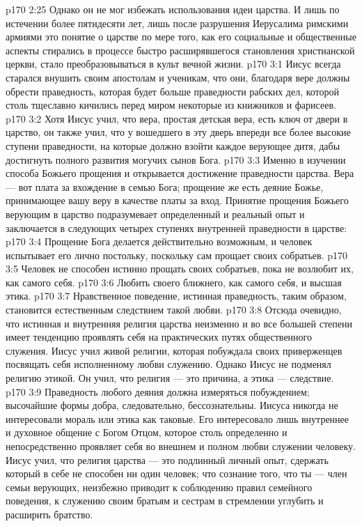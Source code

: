 \vs p170 2:25 Однако он не мог избежать использования идеи царства. И лишь по истечении более пятидесяти лет, лишь после разрушения Иерусалима римскими армиями это понятие о царстве по мере того, как его социальные и общественные аспекты стирались в процессе быстро расширявшегося становления христианской церкви, стало преобразовываться в культ вечной жизни.
\vs p170 3:1 Иисус всегда старался внушить своим апостолам и ученикам, что они, благодаря вере должны обрести праведность, которая будет больше праведности рабских дел, которой столь тщеславно кичились перед миром некоторые из книжников и фарисеев.
\vs p170 3:2 Хотя Иисус учил, что вера, простая детская вера, есть ключ от двери в царство, он также учил, что у вошедшего в эту дверь впереди все более высокие ступени праведности, на которые должно взойти каждое верующее дитя, дабы достигнуть полного развития могучих сынов Бога.
\vs p170 3:3 Именно в изучении способа  Божьего прощения и открывается достижение праведности царства. Вера --- вот плата за вхождение в семью Бога; прощение же есть деяние Божье, принимающее вашу веру в качестве платы за вход. Принятие прощения Божьего верующим в царство подразумевает определенный и реальный опыт и заключается в следующих четырех ступенях внутренней праведности в царстве:
\vs p170 3:4 \bibnobreakspace Прощение Бога делается действительно возможным, и человек испытывает его лично постольку, поскольку сам прощает своих собратьев.
\vs p170 3:5 \bibnobreakspace Человек не способен истинно прощать своих собратьев, пока не возлюбит их, как самого себя.
\vs p170 3:6 \bibnobreakspace Любить своего ближнего, как самого себя, и  высшая этика.
\vs p170 3:7 \bibnobreakspace Нравственное поведение, истинная праведность, таким образом, становится естественным следствием такой любви.
\vs p170 3:8 \pc Отсюда очевидно, что истинная и внутренняя религия царства неизменно и во все большей степени имеет тенденцию проявлять себя на практических путях общественного служения. Иисус учил живой религии, которая побуждала своих приверженцев посвящать себя исполненному любви служению. Однако Иисус не подменял религию этикой. Он учил, что религия --- это причина, а этика --- следствие.
\vs p170 3:9 Праведность любого деяния должна измеряться побуждением; высочайшие формы добра, следовательно, бессознательны. Иисуса никогда не интересовали мораль или этика как таковые. Его интересовало лишь внутреннее и духовное общение с Богом Отцом, которое столь определенно и непосредственно проявляет себя во внешнем и полном любви служении человеку. Иисус учил, что религия царства --- это подлинный личный опыт, сдержать который в себе не способен ни один человек; что сознание того, что ты --- член семьи верующих, неизбежно приводит к соблюдению правил семейного поведения, к служению своим братьям и сестрам в стремлении углубить и расширить братство.
